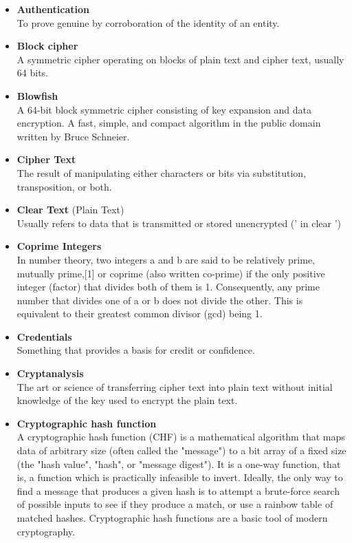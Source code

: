 \begin{itemize}
\item \textbf{Authentication} \\
To prove genuine by corroboration of the identity of an entity.

\item \textbf{Block cipher} \\
A symmetric cipher operating on blocks of plain text and cipher text, usually 64 bits.

\item \textbf{Blowfish}\\
A 64-bit block symmetric cipher consisting of key expansion and data encryption. A fast, simple, and compact algorithm in the public domain written by Bruce Schneier.

\item \textbf{Cipher Text}\\
The result of manipulating either characters or bits via substitution, transposition, or both.

\item \textbf{Clear Text} (Plain Text)\\
Usually refers to data that is transmitted or stored unencrypted (' in clear ')

\item \textbf{Coprime Integers}\\
In number theory, two integers a and b are said to be relatively prime, mutually prime,[1] or coprime (also written co-prime) if the only positive integer (factor) that divides both of them is 1. Consequently, any prime number that divides one of a or b does not divide the other. This is equivalent to their greatest common divisor (gcd) being 1.

\item \textbf{Credentials}\\
Something that provides a basis for credit or confidence.

\item \textbf{Cryptanalysis}\\
The art or science of transferring cipher text into plain text without initial knowledge of the key used to encrypt the plain text.

\item \textbf{Cryptographic hash function}\\
A cryptographic hash function (CHF) is a mathematical algorithm that maps data of arbitrary size (often called the "message") to a bit array of a fixed size (the "hash value", "hash", or "message digest"). It is a one-way function, that is, a function which is practically infeasible to invert. Ideally, the only way to find a message that produces a given hash is to attempt a brute-force search of possible inputs to see if they produce a match, or use a rainbow table of matched hashes. Cryptographic hash functions are a basic tool of modern cryptography.


\end{itemize}
